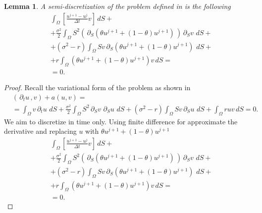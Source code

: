 \documentclass{article}
\newtheorem{lemma}[thm]{Lemma}
\newcommand{\argwrapsquare}[1]{\left[#1\right]}
\newcommand{\intS}[1]{\ensuremath{\int_{\Omega}#1 \, dS}}
\newcommand{\intSlong}[1]{\intS{\argwrapsquare{#1}}}
\newcommand{\darg}[2]{\ensuremath{\, \partial_{#2}#1} \, }
\newcommand{\dt}[1]{\ensuremath{\darg{#1}{t}}}
\newcommand{\dS}[1]{\ensuremath{\darg{#1}{S}}}
\newcommand{\dtu}{\dt{u}}
\newcommand{\dSv}{\dS{v}}
\newcommand{\sigmafrac}{\ensuremath{\frac{\sigma^2}{2}}}
\newcommand{\aform}[2]{\ensuremath{\sigmafrac \intS{S^2 \dS{#2} \dS{#1}} + (\sigma^2 - r) \intS{S #2 \dS{#1}} + \intS{r  #1  #2}}}
\newcommand{\auv}{\aform{u}{v}}
\begin{document}
\begin{lemma}\label{lemma:semi_discrete_prob}
    A semi-discretization of the problem defined in  is the following
     \begin{align*}
        &\intSlong{\frac{u^{j+1} - u^j}{\Delta t}  v} + \\
        &+\sigmafrac \intS{S^2 \left(\dS{\left(\theta u^{j+1} + (1- \theta) u^{j+1} \right)}\right) \dSv} + \\
        &+ (\sigma^2 - r) \intS{S v \dS{\left(\theta u^{j+1} + (1- \theta) u^{j+1} \right)}} + \\
        &+r \intS{\left(\theta u^{j+1} + (1- \theta) u^{j+1} \right)v} =\\
        &=0.
        \end{align*}
\end{lemma}
\begin{proof}
    Recall the variational form of the problem as shown in 
    \begin{align*}
        &\left( \dtu, v\right) + a(u,v) = \\
        &= \intS{v \dtu} + \auv = 0.
    \end{align*}
    We aim to discretize in time only. Using finite difference for approximate the derivative and replacing $u$ with $\theta u^{j+1} + (1- \theta) u^{j+1}$
     \begin{align*}
        &\intSlong{\frac{u^{j+1} - u^j}{\Delta t}  v} + \\
        &+\sigmafrac \intS{S^2 \left(\dS{\left(\theta u^{j+1} + (1- \theta) u^{j+1} \right)}\right) \dSv} + \\
        &+ (\sigma^2 - r) \intS{S v \dS{\left(\theta u^{j+1} + (1- \theta) u^{j+1} \right)}} + \\
        &+r \intS{\left(\theta u^{j+1} + (1- \theta) u^{j+1} \right)v} =\\
        &=0.
        \end{align*}
\end{proof}
\end{document}
